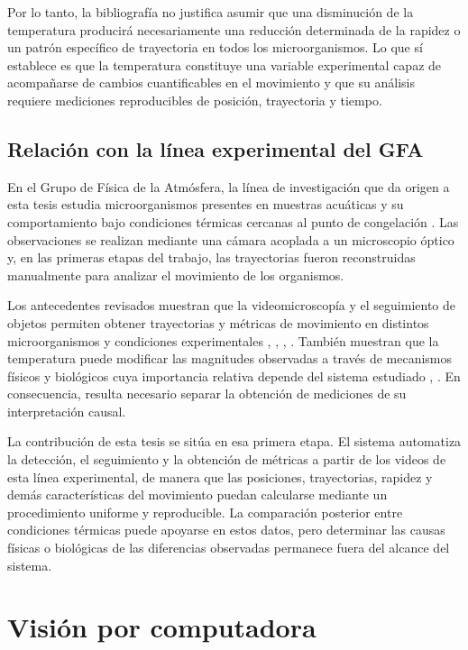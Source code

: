 Por lo tanto, la bibliografía no justifica asumir que una disminución de la temperatura producirá necesariamente una reducción determinada de la rapidez o un patrón específico de trayectoria en todos los microorganismos. Lo que sí establece es que la temperatura constituye una variable experimental capaz de acompañarse de cambios cuantificables en el movimiento y que su análisis requiere mediciones reproducibles de posición, trayectoria y tiempo.

\subsection{Relación con la línea experimental del GFA}

En el Grupo de Física de la Atmósfera, la línea de investigación que da origen a esta tesis estudia microorganismos presentes en muestras acuáticas y su comportamiento bajo condiciones térmicas cercanas al punto de congelación \cite{pedernera2024}. Las observaciones se realizan mediante una cámara acoplada a un microscopio óptico y, en las primeras etapas del trabajo, las trayectorias fueron reconstruidas manualmente para analizar el movimiento de los organismos.

Los antecedentes revisados muestran que la videomicroscopía y el seguimiento de objetos permiten obtener trayectorias y métricas de movimiento en distintos microorganismos y condiciones experimentales \cite{shunmugam2021}, \cite{bente2020}, \cite{yamashita2024}, \cite{junge2003}. También muestran que la temperatura puede modificar las magnitudes observadas a través de mecanismos físicos y biológicos cuya importancia relativa depende del sistema estudiado \cite{beveridge2010}, \cite{nakaoka1977}. En consecuencia, resulta necesario separar la obtención de mediciones de su interpretación causal.

La contribución de esta tesis se sitúa en esa primera etapa. El sistema automatiza la detección, el seguimiento y la obtención de métricas a partir de los videos de esta línea experimental, de manera que las posiciones, trayectorias, rapidez y demás características del movimiento puedan calcularse mediante un procedimiento uniforme y reproducible. La comparación posterior entre condiciones térmicas puede apoyarse en estos datos, pero determinar las causas físicas o biológicas de las diferencias observadas permanece fuera del alcance del sistema.

\section{Visión por computadora}

